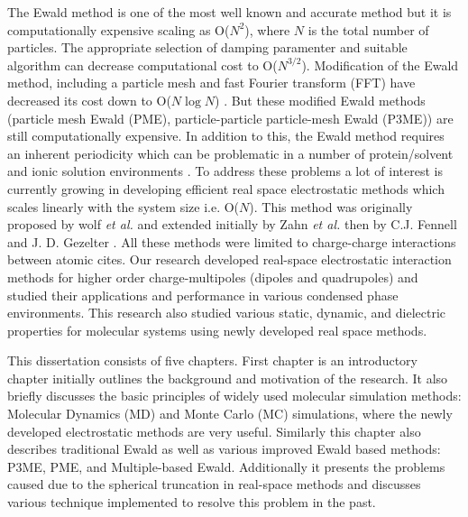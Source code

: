 The Ewald method is one of the most well known and accurate method but it is computationally expensive scaling as O($N^2$), where $N$ is the total number of particles. The appropriate selection of damping paramenter and suitable algorithm can decrease computational cost to O($N^{3/2}$)\cite{Perram88}. Modification of the Ewald method, including a particle mesh and fast Fourier transform (FFT) have decreased its cost down to O($N\log N$) \cite{Shimada93, Luty95, Darden93,Essmann95}. But these modified Ewald methods (particle mesh Ewald (PME), particle-particle particle-mesh Ewald (P3ME)) are still computationally expensive. In addition to this, the Ewald method requires an inherent periodicity which can be problematic in a number of protein/solvent and ionic solution environments \cite{Roberts94,Roberts95,Luty96,Hunenberger99a,Hunenberger99b,Weber00,Gezelter06}. To address these problems a lot of interest is currently growing in developing efficient real space electrostatic methods which scales linearly with the system size i.e. O($N$). This method was originally proposed by wolf \textit{et al.} \cite{Wolf99} and extended initially by Zahn \textit{et al.}\cite{Zahn02} then by C.J. Fennell and J. D. Gezelter \cite{Gezelter06}. All these methods were limited to charge-charge interactions between atomic cites. Our research developed real-space electrostatic interaction methods for higher order charge-multipoles (dipoles and quadrupoles) and studied their applications and performance in various condensed phase environments. This research also studied various static, dynamic, and dielectric properties for molecular systems using newly developed real space methods. 

%

This dissertation consists of five chapters. First chapter is an introductory chapter initially outlines the background and motivation of the research. It also briefly  discusses the basic principles of widely used molecular simulation methods: Molecular Dynamics (MD) and Monte Carlo (MC) simulations, where the newly developed electrostatic methods are very useful. Similarly this chapter also describes traditional Ewald as well as various improved Ewald based methods: P3ME, PME, and Multiple-based Ewald. Additionally it presents the problems caused due to the spherical truncation in real-space methods and discusses various technique implemented to resolve this problem in the past.

